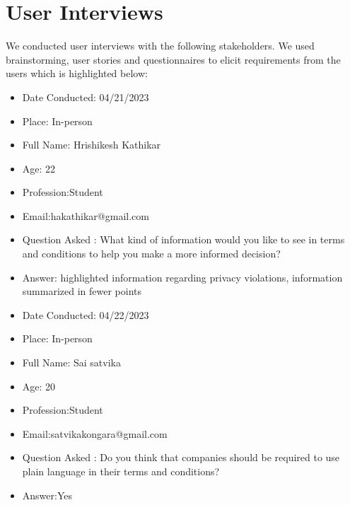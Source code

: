     
\section{ User Interviews \label{Section::User Interviews} }
We conducted user interviews with the following stakeholders. We used brainstorming, user stories and questionnaires to elicit requirements from the users which is highlighted below: 

\begin{itemize}
\item Date Conducted: 04/21/2023
\item Place: In-person
    \item Full Name: Hrishikesh Kathikar

    \item Age: 22

    \item Profession:Student 

    \item Email:hakathikar@gmail.com

    \item Question Asked : What kind of information would you like to see in terms and conditions to help you make a more informed decision?

    \item Answer: highlighted information regarding privacy violations, information summarized in fewer points
\end{itemize}
\begin{itemize}
\item Date Conducted: 04/22/2023
\item Place: In-person
    \item Full Name: Sai satvika

    \item Age: 20

    \item Profession:Student 

    \item Email:satvikakongara@gmail.com

    \item Question Asked : Do you think that companies should be required to use plain language in their terms and conditions?

    \item Answer:Yes 
\end{itemize}



